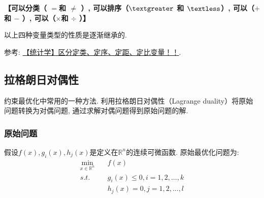 \textbf{【可以分类（ $=$和 $\neq$ ）, 可以排序（$\textgreater$ 和 $\textless$）, 可以（$+$ 和 $-$ ）, 可以（$\times$和 $\div$ ）】}

以上四种变量类型的性质是逐渐继承的. 

参考: \href{https://blog.csdn.net/YYIverson/article/details/100068865}{【统计学】区分定类、定序、定距、定比变量！！}. 

\subsection{拉格朗日对偶性}
约束最优化中常用的一种方法. 利用拉格朗日对偶性（Lagrange duality）将原始问题转换为对偶问题, 通过求解对偶问题得到原始问题的解. 

\subsubsection{原始问题}假设$f(x), g_i(x), h_j(x)$是定义在$\mathbb{R}^n$的连续可微函数. 原始最优化问题为: 
\begin{align}
	\mathop{min}_{x \in \mathbb{R}^n}&\quad f(x) \nonumber \\
	s.t.&\quad g_i(x) \leqslant 0, i = 1, 2, ..., k \nonumber \\
		&\quad h_j(x) = 0, j = 1, 2, ..., l \nonumber
\end{align}

